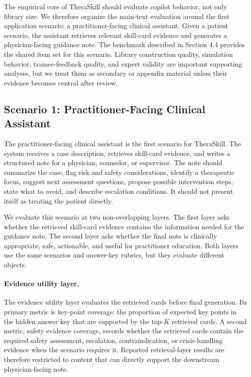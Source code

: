 \documentclass[11pt]{article}
\begin{document}
The empirical core of TheraSkill should evaluate copilot behavior, not only library size. We therefore organize the main-text evaluation around the first application scenario: a practitioner-facing clinical assistant. Given a patient scenario, the assistant retrieves relevant skill-card evidence and generates a physician-facing guidance note. The benchmark described in Section 4.4 provides the shared item set for this scenario. Library construction quality, simulation behavior, trainee-feedback quality, and expert validity are important supporting analyses, but we treat them as secondary or appendix material unless their evidence becomes central after review.

\subsection{Scenario 1: Practitioner-Facing Clinical Assistant}

The practitioner-facing clinical assistant is the first scenario for TheraSkill. The system receives a case description, retrieves skill-card evidence, and writes a structured note for a physician, counselor, or supervisor. The note should summarize the case, flag risk and safety considerations, identify a therapeutic focus, suggest next assessment questions, propose possible intervention steps, state what to avoid, and describe escalation conditions. It should not present itself as treating the patient directly.

We evaluate this scenario at two non-overlapping layers. The first layer asks whether the retrieved skill-card evidence contains the information needed for the guidance note. The second layer asks whether the final note is clinically appropriate, safe, actionable, and useful for practitioner education. Both layers use the same scenarios and answer-key rubrics, but they evaluate different objects.

\paragraph{Evidence utility layer.}
The evidence utility layer evaluates the retrieved cards before final generation. Its primary metric is key-point coverage: the proportion of expected key points in the hidden answer key that are supported by the top-$K$ retrieved cards. A second metric, safety evidence coverage, records whether the retrieved cards contain the required safety assessment, escalation, contraindication, or crisis-handling evidence when the scenario requires it. Reported retrieval-layer results are therefore restricted to content that can directly support the downstream physician-facing note.
\end{document}
